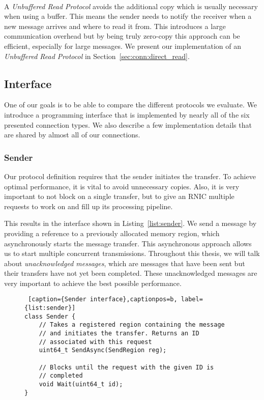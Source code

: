 \paragraph{} A \emph{Unbuffered Read Protocol} avoids the additional copy which is usually necessary when using a buffer. This means the 
sender needs to notify the receiver when a new message arrives and where to read it from.  This introduces a large
communication overhead but by being truly zero-copy this approach can be efficient, especially for large messages.
We present our implementation of an \emph{Unbuffered Read Protocol} in Section~\ref{sec:conn:direct_read}.


\pagebreak
\subsection{Interface}

One of our goals is to be able to compare the different protocols we evaluate. We introduce a programming 
interface that is implemented by nearly all of the six presented connection types. We also describe a few implementation 
details that are shared by almost all of our connections.

\subsubsection{Sender}

Our protocol definition requires that the sender initiates the transfer. To achieve optimal performance, it is
vital to avoid unnecessary copies. Also, it is very important to not block on a single transfer, but to give an RNIC multiple
requests to work on and fill up its processing pipeline. 

This results in the interface shown in Listing~\ref{list:sender}. We send a message by providing a reference
to a previously allocated memory region, which asynchronously starts the message transfer. This asynchronous approach allows
us to start multiple concurrent transmissions. Throughout this thesis, we will talk about \emph{unacknowledged messages}, which
are messages that have been sent but their transfers have not yet been completed. These unacknowledged messages are very 
important to achieve the best possible performance.

\begin{figure}[htp]
\begin{lstlisting} [caption={Sender interface},captionpos=b, label={list:sender}] 
class Sender {
    // Takes a registered region containing the message
    // and initiates the transfer. Returns an ID 
    // associated with this request
    uint64_t SendAsync(SendRegion reg);

    // Blocks until the request with the given ID is
    // completed
    void Wait(uint64_t id);
}
\end{lstlisting}
\end{figure}

